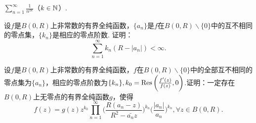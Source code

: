 \begin{xiti}
\begin{enuma}
      \item $\sum_{n=1}^\infty\frac1{n^{2k}}$（$k\in\mathbb N$）.
    \end{enuma}
  \item 设$f$是$B(0,R)$上非常数的有界全纯函数，$\{a_n\}$是$f$在$B(0,R)\backslash\{0\}$中的互不相同的零点集，$\{k_n\}$是相应的零点阶数. 证明：
     \[
       \sum_{n=1}^\infty k_n(R-|a_n|) < \infty.
     \]
  \item 设$f$是$B(0,R)$上非常数的有界全纯函数，$f$在$B(0,R)\backslash\{0\}$中的全部互不相同的零点集为$\{a_n\}$，相应的零点阶数为$\{k_n\},k_0=\operatorname*{Res}\bigg(\frac{f'(z)}{f(z)},0\bigg)$.证明：一定存在$B(0,R)$上无零点的有界全纯函数$g$，使得
     \[
       f(z) = g(z)z^{k_0}\prod_{n=1}^\infty\bigg(\frac{R(a_n-z)}{R^2-\bar {a_n}z}\bigg)^{k_n}
       \bigg(\frac{|a_n|}{a_n}\bigg)^{k_n},\forall z\in B(0,R).
     \]
\end{xiti}
